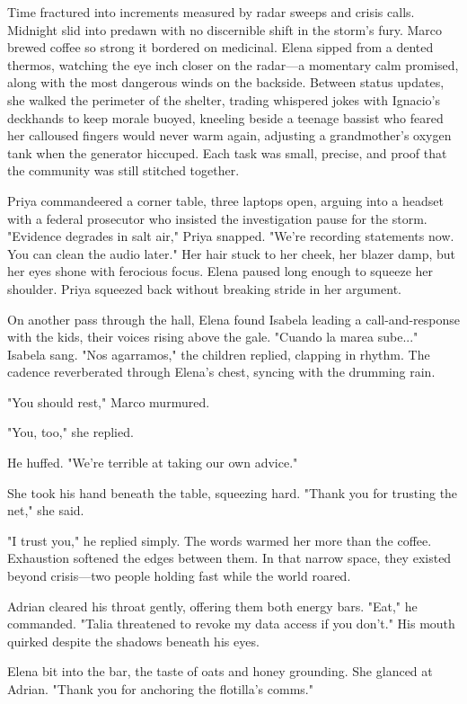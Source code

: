 Time fractured into increments measured by radar sweeps and crisis calls. Midnight slid into predawn with no discernible shift in the storm's fury. Marco brewed coffee so strong it bordered on medicinal. Elena sipped from a dented thermos, watching the eye inch closer on the radar—a momentary calm promised, along with the most dangerous winds on the backside. Between status updates, she walked the perimeter of the shelter, trading whispered jokes with Ignacio's deckhands to keep morale buoyed, kneeling beside a teenage bassist who feared her calloused fingers would never warm again, adjusting a grandmother's oxygen tank when the generator hiccuped. Each task was small, precise, and proof that the community was still stitched together.

Priya commandeered a corner table, three laptops open, arguing into a headset with a federal prosecutor who insisted the investigation pause for the storm. "Evidence degrades in salt air," Priya snapped. "We're recording statements now. You can clean the audio later." Her hair stuck to her cheek, her blazer damp, but her eyes shone with ferocious focus. Elena paused long enough to squeeze her shoulder. Priya squeezed back without breaking stride in her argument.

On another pass through the hall, Elena found Isabela leading a call-and-response with the kids, their voices rising above the gale. "Cuando la marea sube..." Isabela sang. "Nos agarramos," the children replied, clapping in rhythm. The cadence reverberated through Elena's chest, syncing with the drumming rain.

"You should rest," Marco murmured.

"You, too," she replied.

He huffed. "We're terrible at taking our own advice."

She took his hand beneath the table, squeezing hard. "Thank you for trusting the net," she said.

"I trust you," he replied simply. The words warmed her more than the coffee. Exhaustion softened the edges between them. In that narrow space, they existed beyond crisis—two people holding fast while the world roared.

Adrian cleared his throat gently, offering them both energy bars. "Eat," he commanded. "Talia threatened to revoke my data access if you don't." His mouth quirked despite the shadows beneath his eyes.

Elena bit into the bar, the taste of oats and honey grounding. She glanced at Adrian. "Thank you for anchoring the flotilla's comms."


